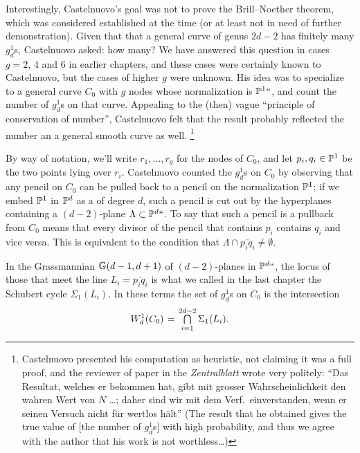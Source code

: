 Interestingly, Castelnuovo's goal was not to prove the Brill--Noether
theorem, which was considered established at the time (or at least not
in need of further demonstration). Given that
that a general curve of genus $2d-2$ has finitely many $g^{1}_{d}$s,
Castelnuovo asked: how many? We have answered this question in 
cases $g = 2$, $4$ and 6 in earlier chapters, 
and these cases were certainly known to Castelnuovo, 
but the cases of higher $g$ were unknown.
His idea was to specialize to a general curve $C_0$ with $g$ nodes
whose normalization is ${\mathbb P}^1` `$, and count the number of $g^1_d$s on
that curve. Appealing to the (then) vague ``principle of conservation
%
of number'', Castelnuovo felt that the result probably reflected the
number an a general smooth curve as well.%
%
\footnote{Castelnuovo
  presented his computation as heuristic, not claiming it was a full
  proof, and the reviewer of 
paper in the \textit{Zentralblatt 
}  
wrote very politely: 
``Das Resultat, welches er bekommen hat, gibt mit grosser
Wahrscheinlichkeit den wahren Wert von $N$ \dots; daher sind wir mit dem
Verf.\ einverstanden, wenn er seinen Versuch nicht f\"ur wertlos h\"alt''
(The result that he obtained gives the true value of [the number of
$g^1_d$s] with high probability, and thus we agree with the author that
his work is not worthless\dots)}

By way of notation, we'll write $r_1,\dots,r_g$ for the nodes of
$C_0$, and let $p_i, q_i \in {\mathbb P}^1$ be the two points lying over $r_i$.
Castelnuovo counted the $g^1_d$s on $C_0$ by observing that any pencil
on $C_0$ can be pulled back to a pencil on the normalization ${\mathbb P}^1$;
if we embed ${\mathbb P}^1$ in ${\mathbb P}^d$ as a
%
of degree $d$, such a pencil is cut out by the hyperplanes containing
 a $(d-2)$-plane $\Lambda \subset {\mathbb P}^d``$.
To say that such a pencil is a pullback from $C_0$ means that every
divisor of the pencil that contains $p_i$ contains $q_i$ and vice
versa. This  is equivalent to the condition that $\Lambda \cap
\overline{p_iq_i} \neq \emptyset$.

In the Grassmannian ${\mathbb G}(d-1, d+1)$ of $(d-2)$-planes in ${\mathbb P}^d``$,
the locus of those that meet the line $L_i = \overline{p_iq_i}$ is
what we called in the last chapter the Schubert cycle $\Sigma_1(L_i)$.
In these terms the set of $g^1_d$s on $C_0$ is the intersection
$$
W^1_d(C_0) \; = \; \tsty\bigcap\limits_{i=1}^{2d-2} \Sigma_1(L_i).
$$


